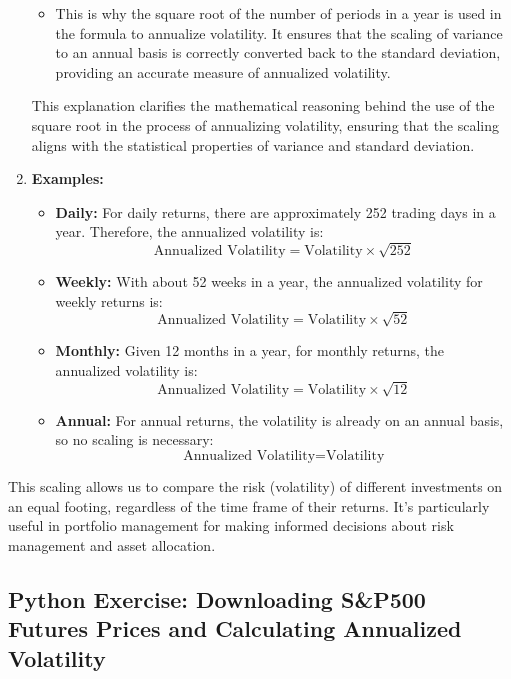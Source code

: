 \documentclass{article}
\begin{document}
\begin{enumerate}
\begin{itemize}
        \item This is why the square root of the number of periods in a year is used in the formula to annualize volatility. It ensures that the scaling of variance to an annual basis is correctly converted back to the standard deviation, providing an accurate measure of annualized volatility.
    \end{itemize}

    This explanation clarifies the mathematical reasoning behind the use of the square root in the process of annualizing volatility, ensuring that the scaling aligns with the statistical properties of variance and standard deviation.


    
    \item \textbf{Examples:}
    \begin{itemize}
        \item \textbf{Daily:} For daily returns, there are approximately 252 trading days in a year. Therefore, the annualized volatility is:
        \[ \text{Annualized Volatility} = \text{Volatility} \times \sqrt{252} \]
        
        \item \textbf{Weekly:} With about 52 weeks in a year, the annualized volatility for weekly returns is:
        \[ \text{Annualized Volatility} = \text{Volatility} \times \sqrt{52} \]
        
        \item \textbf{Monthly:} Given 12 months in a year, for monthly returns, the annualized volatility is:
        \[ \text{Annualized Volatility} = \text{Volatility} \times \sqrt{12} \]
        
        \item \textbf{Annual:} For annual returns, the volatility is already on an annual basis, so no scaling is necessary:
        \[ \text{Annualized Volatility} = \text{Volatility} \]
    \end{itemize}
\end{enumerate}

This scaling allows us to compare the risk (volatility) of different investments on an equal footing, regardless of the time frame of their returns. It's particularly useful in portfolio management for making informed decisions about risk management and asset allocation.

\subsection{Python Exercise: Downloading S\&P500 Futures Prices and Calculating Annualized Volatility}
\end{document}
